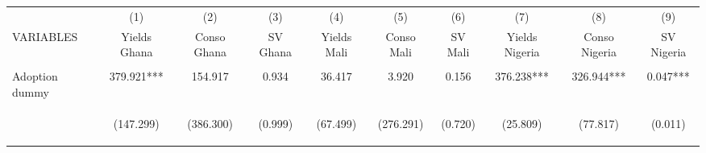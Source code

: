 \begin{center}
\begin{tabular}{lccccccccc} \hline
 & (1) & (2) & (3) & (4) & (5) & (6) & (7) & (8) & (9) \\
VARIABLES & Yields Ghana & Conso Ghana & SV Ghana & Yields Mali & Conso Mali & SV Mali & Yields Nigeria & Conso Nigeria & SV Nigeria \\ \hline
\vspace{4pt} & \begin{footnotesize}\end{footnotesize} & \begin{footnotesize}\end{footnotesize} & \begin{footnotesize}\end{footnotesize} & \begin{footnotesize}\end{footnotesize} & \begin{footnotesize}\end{footnotesize} & \begin{footnotesize}\end{footnotesize} & \begin{footnotesize}\end{footnotesize} & \begin{footnotesize}\end{footnotesize} & \begin{footnotesize}\end{footnotesize} \\
Adoption dummy & 379.921*** & 154.917 & 0.934 & 36.417 & 3.920 & 0.156 & 376.238*** & 326.944*** & 0.047*** \\
 & \begin{footnotesize}(147.299)\end{footnotesize} & \begin{footnotesize}(386.300)\end{footnotesize} & \begin{footnotesize}(0.999)\end{footnotesize} & \begin{footnotesize}(67.499)\end{footnotesize} & \begin{footnotesize}(276.291)\end{footnotesize} & \begin{footnotesize}(0.720)\end{footnotesize} & \begin{footnotesize}(25.809)\end{footnotesize} & \begin{footnotesize}(77.817)\end{footnotesize} & \begin{footnotesize}(0.011)\end{footnotesize} \\

\end{tabular}
\end{center}

